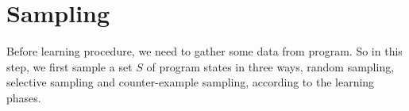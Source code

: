 
\section{Sampling}
Before learning procedure, we need to gather some data from program. 
So in this step, we first sample
a set $S$ of program states in three ways, random sampling, selective sampling and counter-example sampling, 
according to the learning phases.



